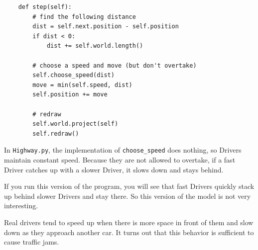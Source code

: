 \documentclass[10pt]{book}
\begin{document}
\begin{verbatim}
    def step(self):
        # find the following distance
        dist = self.next.position - self.position
        if dist < 0:
            dist += self.world.length()

        # choose a speed and move (but don't overtake)
        self.choose_speed(dist)
        move = min(self.speed, dist)
        self.position += move

        # redraw
        self.world.project(self)
        self.redraw()
\end{verbatim}

In {\tt Highway.py}, the implementation of \verb"choose_speed"
does nothing, so Drivers maintain constant speed.  Because
they are not allowed to overtake, if a fast Driver catches up
with a slower Driver, it slows down and stays behind.

If you run this version of the program, you will see that fast
Drivers quickly stack up behind slower Drivers and stay there.
So this version of the model is not very interesting.

Real drivers tend to speed up when there is more space
in front of them and slow down as they approach another car.
It turns out that this behavior is sufficient to cause
traffic jams.
\end{document}

